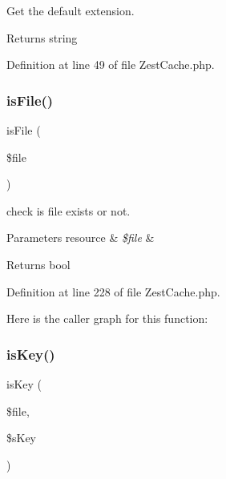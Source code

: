 Get the default extension.

\begin{DoxyReturn}{Returns}
string 
\end{DoxyReturn}


Definition at line 49 of file Zest\+Cache.\+php.

\mbox{\label{class_zest_1_1_cache_1_1_zest_cache_1_1_zest_cache_acf964fa7d3e69b8c361f2edf5d6790eb}} 
\subsubsection{\texorpdfstring{is\+File()}{isFile()}}
{\footnotesize\ttfamily is\+File (\begin{DoxyParamCaption}\item[{}]{\$file }\end{DoxyParamCaption})}

check is file exists or not.


\begin{DoxyParams}[1]{Parameters}
resource & {\em \$file} & \\
\hline
\end{DoxyParams}
\begin{DoxyReturn}{Returns}
bool 
\end{DoxyReturn}


Definition at line 228 of file Zest\+Cache.\+php.

Here is the caller graph for this function\+:
\mbox{\label{class_zest_1_1_cache_1_1_zest_cache_1_1_zest_cache_a2a03f6234b8581ecba754456e0fc13a9}} 
\subsubsection{\texorpdfstring{is\+Key()}{isKey()}}
{\footnotesize\ttfamily is\+Key (\begin{DoxyParamCaption}\item[{}]{\$file,  }\item[{}]{\$s\+Key }\end{DoxyParamCaption})}

